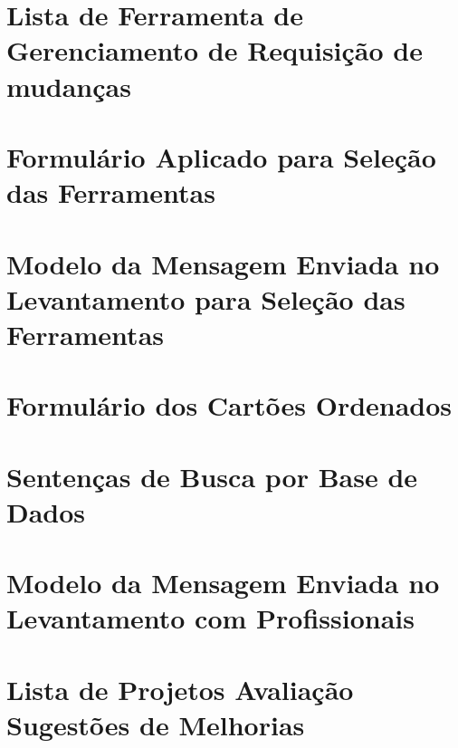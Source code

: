 \begin{appendices}

\chapter{Lista de Ferramenta de Gerenciamento de Requisição de mudanças}\label{ch:app-lista-fgrm}


\chapter{Formulário Aplicado para Seleção das Ferramentas}\label{ch:app-form-selecao-ferramentas}


\chapter{Modelo da Mensagem Enviada no Levantamento para Seleção das
    Ferramentas}\label{ch:app-template-msg-sel-ferrramentas}


\chapter{Formulário dos Cartões Ordenados}\label{ch:app-form-cartoes-ordenados}


\chapter{Sentenças de Busca por Base de Dados}\label{ch:app-setenca-de-busca-base-dados}


\chapter{Modelo da Mensagem Enviada no Levantamento com
    Profissionais}\label{ch:app-template-msg-pesquisa-profissionais}


\chapter{Lista de Projetos Avaliação Sugestões de Melhorias}\label{ch:app-tb-lista-projetos-sug-melhorias}



\end{appendices}
